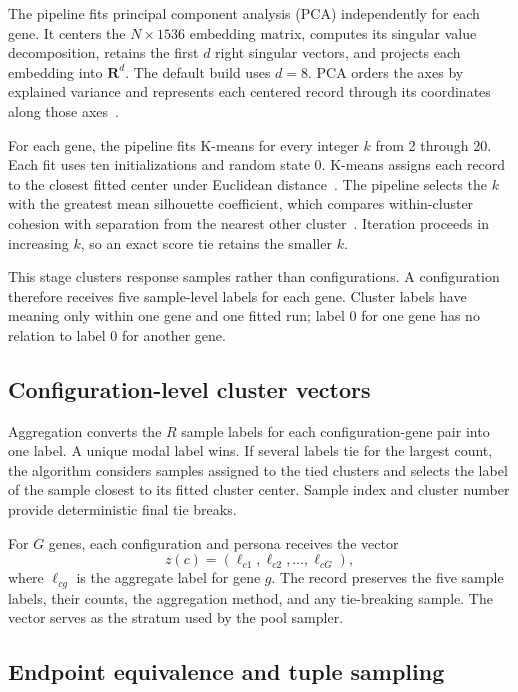 \documentclass[11pt]{article}
\newcommand{\R}{\mathbf{R}}
\begin{document}
The pipeline fits principal component analysis (PCA) independently for each gene.  It centers the $N\times1536$ embedding matrix, computes its singular value decomposition, retains the first $d$ right singular vectors, and projects each embedding into $\R^d$.  The default build uses $d=8$.  PCA orders the axes by explained variance and represents each centered record through its coordinates along those axes~\cite{sklearn-pca}.

For each gene, the pipeline fits K-means for every integer $k$ from 2 through 20.  Each fit uses ten initializations and random state 0.  K-means assigns each record to the closest fitted center under Euclidean distance~\cite{sklearn-kmeans}.  The pipeline selects the $k$ with the greatest mean silhouette coefficient, which compares within-cluster cohesion with separation from the nearest other cluster~\cite{sklearn-silhouette}.  Iteration proceeds in increasing $k$, so an exact score tie retains the smaller $k$.

This stage clusters response samples rather than configurations.  A configuration therefore receives five sample-level labels for each gene.  Cluster labels have meaning only within one gene and one fitted run; label 0 for one gene has no relation to label 0 for another gene.

\subsection{Configuration-level cluster vectors}

Aggregation converts the $R$ sample labels for each configuration-gene pair into one label.  A unique modal label wins.  If several labels tie for the largest count, the algorithm considers samples assigned to the tied clusters and selects the label of the sample closest to its fitted cluster center.  Sample index and cluster number provide deterministic final tie breaks.

For $G$ genes, each configuration and persona receives the vector
\[
  z(c)=(\ell_{c1},\ell_{c2},\ldots,\ell_{cG}),
\]
where $\ell_{cg}$ is the aggregate label for gene $g$.  The record preserves the five sample labels, their counts, the aggregation method, and any tie-breaking sample.  The vector serves as the stratum used by the pool sampler.

\subsection{Endpoint equivalence and tuple sampling}
\end{document}
